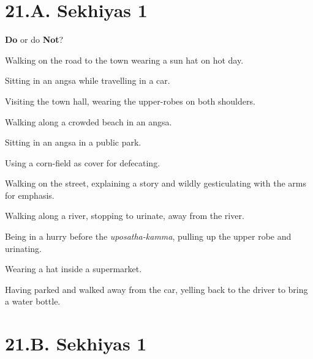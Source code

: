 \chapter{21.A. Sekhiyas 1}
\renewcommand*{\theChapterTitle}{21.A. Sekhiyas 1}

\begin{exam}{\autoExamName}

  \begin{problem*}
    \textbf{Do} or do \textbf{Not}?

    \bigskip

    \begin{parts}

    \item {} Walking on the road to the town wearing a sun hat on hot day.

    \bigskip

    \item {} Sitting in an angsa while travelling in a car.

    \bigskip

    \item {} Visiting the town hall, wearing the upper-robes on both shoulders.

    \bigskip

    \item {} Walking along a crowded beach in an angsa.

    \bigskip

    \item {} Sitting in an angsa in a public park.

    \bigskip

    \item {} Using a corn-field as cover for defecating.

    \bigskip

    \item {} Walking on the street, explaining a story and wildly gesticulating with the arms for emphasis.

    \bigskip

    \item {} Walking along a river, stopping to urinate, away from the river.

    \bigskip

    \item {} Being in a hurry before the \emph{uposatha-kamma}, pulling up the upper robe and urinating.

    \bigskip

    \item {} Wearing a hat inside a supermarket.

    \bigskip

    \item {} Having parked and walked away from the car, yelling back to the driver to bring a water bottle.

    \end{parts}

  \end{problem*}

\end{exam}

\chapter{21.B. Sekhiyas 1}
\renewcommand*{\theChapterTitle}{21.B. Sekhiyas 1}
